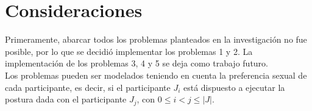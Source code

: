 \documentclass[12pt]{article}
\begin{document}
\newpage

\section{Consideraciones}

Primeramente, abarcar todos los problemas planteados en la investigación no fue posible, por lo que se decidió implementar los problemas 1 y 2. La implementación de los problemas 3, 4 y 5 se deja como trabajo futuro.
\\
Los problemas pueden ser modelados teniendo en cuenta la preferencia sexual de cada participante, es decir, si el participante $J_i$ está dispuesto a ejecutar la postura dada con el participante $J_j$, con $0 \leq i <j \leq |J|$. 
\end{document}
